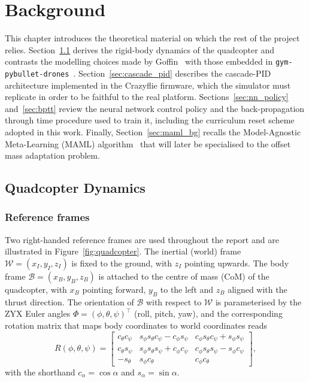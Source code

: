 \documentclass[11pt,a4paper]{article}
\theoremstyle{remark}
\numberwithin{equation}{section}
\begin{document}
\newpage
\section{Background}

This chapter introduces the theoretical material on which the rest of the project relies.
Section~\ref{sec:dynamics} derives the rigid-body dynamics of the quadcopter and contrasts the
modelling choices made by Goffin~\cite{goffin2026} with those embedded in
\texttt{gym-pybullet-drones}~\cite{panerati2021}. Section~\ref{sec:cascade_pid} describes the
cascade-PID architecture implemented in the Crazyflie firmware, which the simulator must
replicate in order to be faithful to the real platform. Sections~\ref{sec:nn_policy}
and~\ref{sec:bptt} review the neural network control policy and the back-propagation through
time procedure used to train it, including the curriculum reset scheme adopted in this work.
Finally, Section~\ref{sec:maml_bg} recalls the Model-Agnostic Meta-Learning (MAML)
algorithm~\cite{finn2017maml} that will later be specialised to the offset mass adaptation
problem.

\subsection{Quadcopter Dynamics}\label{sec:dynamics}

\subsubsection*{Reference frames}

Two right-handed reference frames are used throughout the report and are illustrated in
Figure~\ref{fig:quadcopter}. The inertial (world) frame $\mathcal{W} = (x_I, y_I, z_I)$ is
fixed to the ground, with $z_I$ pointing upwards. The body frame
$\mathcal{B} = (x_B, y_B, z_B)$ is attached to the centre of mass (CoM) of the quadcopter,
with $x_B$ pointing forward, $y_B$ to the left and $z_B$ aligned with the thrust direction.
The orientation of $\mathcal{B}$ with respect to $\mathcal{W}$ is parameterised by the
ZYX Euler angles $\Phi = (\phi, \theta, \psi)^\top$ (roll, pitch, yaw), and the corresponding
rotation matrix that maps body coordinates to world coordinates reads
\begin{equation}
R(\phi,\theta,\psi) =
\begin{bmatrix}
c_\theta c_\psi & s_\phi s_\theta c_\psi - c_\phi s_\psi & c_\phi s_\theta c_\psi + s_\phi s_\psi \\
c_\theta s_\psi & s_\phi s_\theta s_\psi + c_\phi c_\psi & c_\phi s_\theta s_\psi - s_\phi c_\psi \\
-s_\theta      & s_\phi c_\theta                          & c_\phi c_\theta
\end{bmatrix},
\label{eq:rotation}
\end{equation}
with the shorthand $c_\alpha = \cos\alpha$ and $s_\alpha = \sin\alpha$.
\end{document}

